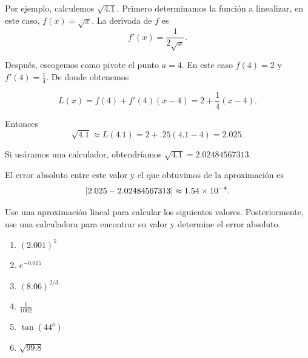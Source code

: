     Por ejemplo, calculemos $\sqrt{4.1}.$ Primero determinamos la función a linealizar, en este caso, $f(x)=\sqrt{x}.$ La
    derivada de $f$ es
    $$
    f'(x)=\dfrac{1}{2\sqrt{x}}.
    $$



    Después, escogemos como pivote el punto $a=4.$ En este caso $f(4)=2$ y $f'(4)=\frac{1}{4}.$ De donde obtenemos
    
    $$
    L(x)=f(4)+f'(4)(x-4)=2+\frac{1}{4}(x-4).
    $$



    Entonces
    $$
    \sqrt{4.1}\approx L(4.1) =2+.25(4.1-4)=2.025.
    $$



    Si usáramos una calculador, obtendríamos $\sqrt{4.1}=2.02484567313.$



    El error absoluto entre este valor y el que
    obtuvimos de la aproximación es
    $$
    \left|2.025-2.02484567313\right|\approx 1.54 \times 10^{-4}.
    $$
    



    
    \begin{problema}
        Use una aproximación lineal para calcular los siguientes valores. Posteriormente, use una calculadora para encontrar
        su valor y determine el error absoluto.
        \begin{enumerate}
            \item $(2.001)^{5}$
            \item $e^{-0.015}$
            \item $(8.06)^{2/3}$
            \item $\frac{1}{1002}$
            \item $\tan(44^{o})$
            \item $\sqrt{99.8}$
        \end{enumerate}
        
    \end{problema}

